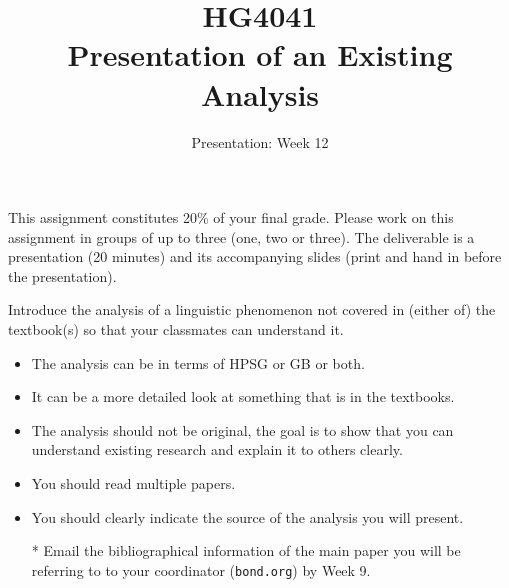 \documentclass[a4paper,12pt]{article}
\title{HG4041 \\ 
  Presentation of an Existing Analysis}
\date{Presentation: Week 12}
\begin{document}
\maketitle

This assignment constitutes 20\% of your final grade.  Please work on
this assignment in groups of up to three (one, two or three).  The
deliverable is a presentation (20 minutes) and its accompanying slides
(print and hand in before the presentation).

\bigskip\bigskip\bigskip

Introduce the analysis of a linguistic phenomenon not covered in (either of) the
textbook(s) so that your classmates can understand it.
\begin{itemize}
\item The analysis can be in terms of HPSG or GB or both.
\item It can be a more detailed look at something that is in the textbooks.
\item The analysis should not be original, the goal is to show that
  you can understand existing research and explain it to others
  clearly.
\item You should read multiple papers.
\item You should clearly indicate the source of the analysis you will present.
\item[*] Email the bibliographical information of the  main paper you will be referring to to your coordinator (\texttt{bond\@ieee.org}) by Week 9.
\end{itemize}
\end{document}

